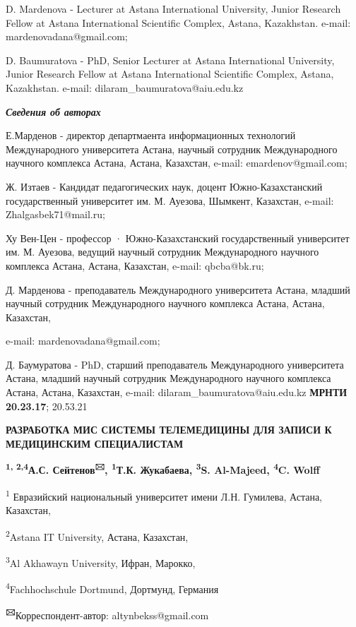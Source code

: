 D. Mardenova - Lecturer at Astana International University, Junior
Research Fellow at Astana International Scientific Complex, Astana,
Kazakhstan. e-mail: mardenovadana@gmail.com;

D. Baumuratova - PhD, Senior Lecturer at Astana International
University, Junior Research Fellow at Astana International Scientific
Complex, Astana, Kazakhstan. e-mail: dilaram\_baumuratova@aiu.edu.kz

\emph{{\bfseries Сведения об авторах}}

Е.Марденов - директор департмаента информационных технологий
Международного университета Астана, научный сотрудник Международного
научного комплекса Астана, Астана, Казахстан, e-mail:
emardenov@gmail.com;

Ж. Изтаев - Кандидат педагогических наук, доцент Южно-Казахстанский
государственный университет им. М. Ауезова, Шымкент, Казахстан, e-mail:
Zhalgasbek71@mail.ru;

Ху Вен-Цен - профессор · Южно-Казахстанский государственный университет
им. М. Ауезова, ведущий научный сотрудник Международного научного
комплекса Астана, Астана, Казахстан, e-mail: qbcba@bk.ru;

Д. Марденова - преподаватель Международного университета Астана, младший
научный сотрудник Международного научного комплекса Астана, Астана,
Казахстан,

e-mail: mardenovadana@gmail.com;

Д. Баумуратова - PhD, старший преподаватель Международного университета
Астана, младший научный сотрудник Международного научного комплекса
Астана, Астана, Казахстан, e-mail: dilaram\_baumuratova@aiu.edu.kz\newpage
{\bfseries МРНТИ 20.23.17}; 20.53.21

{\bfseries РАЗРАБОТКА МИС СИСТЕМЫ ТЕЛЕМЕДИЦИНЫ ДЛЯ ЗАПИСИ К МЕДИЦИНСКИМ
СПЕЦИАЛИСТАМ}

{\bfseries \textsuperscript{1, 2,4}А.С. Сейтенов\textsuperscript{🖂},
\textsuperscript{1}Т.К. Жукабаева, \textsuperscript{3}S. Al-Majeed,
\textsuperscript{4}C. Wolff}

\textsuperscript{1} Евразийский национальный университет имени Л.Н.
Гумилева, Астана, Казахстан,

\textsuperscript{2}Astana IT University, Астана, Казахстан,

\textsuperscript{3}Al Akhawayn University, Ифран, Марокко,

\textsuperscript{4}Fachhochschule Dortmund, Дортмунд, Германия

{\bfseries \textsuperscript{🖂}}Корреспондент-автор: altynbekss@gmail.com

